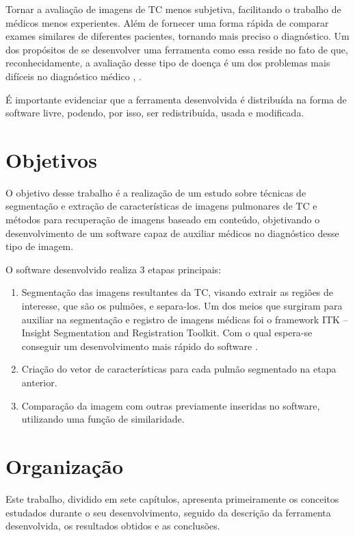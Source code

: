 Tornar a avaliação de imagens de TC menos subjetiva, facilitando o trabalho de médicos menos experientes. Além de fornecer uma forma rápida de comparar exames similares de diferentes pacientes, tornando mais preciso o diagnóstico. Um dos propósitos de se desenvolver uma ferramenta como essa reside no fato de que, reconhecidamente, a avaliação desse tipo de doença é um dos problemas mais difíceis no diagnóstico médico \cite{doi}, \cite{bick}.

É importante evidenciar que a ferramenta desenvolvida é distribuída na forma de software livre, podendo, por isso, ser redistribuída, usada e modificada.

\section{Objetivos}

O objetivo desse trabalho é a realização de um estudo sobre técnicas de segmentação e extração de características de imagens pulmonares de TC e métodos para recuperação de imagens baseado em conteúdo, objetivando o desenvolvimento de um software capaz de auxiliar médicos no diagnóstico desse tipo de imagem.

O software desenvolvido realiza 3 etapas principais:
\begin{enumerate}
 \item Segmentação das imagens resultantes da TC, visando extrair as regiões de interesse, que são os pulmões, e separa-los. Um dos meios que surgiram para auxiliar na segmentação e registro de imagens médicas foi o framework ITK – Insight Segmentation and Registration Toolkit. Com o qual espera-se conseguir um desenvolvimento mais rápido do software \cite{yoo}.
 \item Criação do vetor de características para cada pulmão segmentado na etapa anterior.
 \item Comparação da imagem com outras previamente inseridas no software, utilizando uma função de similaridade.
\end{enumerate}

\section{Organização}

Este trabalho, dividido em sete capítulos, apresenta primeiramente os conceitos estudados durante o seu desenvolvimento, seguido da descrição da ferramenta desenvolvida, os resultados obtidos e as conclusões.

